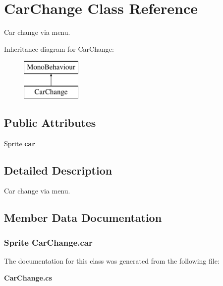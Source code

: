 \section{Car\+Change Class Reference}
\label{class_car_change}


Car change via menu.  


Inheritance diagram for Car\+Change\+:\begin{figure}[H]
\begin{center}
\leavevmode
\includegraphics[height=2.000000cm]{class_car_change}
\end{center}
\end{figure}
\subsection*{Public Attributes}
\begin{DoxyCompactItemize}
\item 
Sprite {\bf car}
\end{DoxyCompactItemize}


\subsection{Detailed Description}
Car change via menu. 



\subsection{Member Data Documentation}
\subsubsection[{car}]{\setlength{\rightskip}{0pt plus 5cm}Sprite Car\+Change.\+car}\label{class_car_change_a8d7e3c8c5682f5a502d46c7c48706d09}


The documentation for this class was generated from the following file\+:\begin{DoxyCompactItemize}
\item 
{\bf Car\+Change.\+cs}\end{DoxyCompactItemize}
